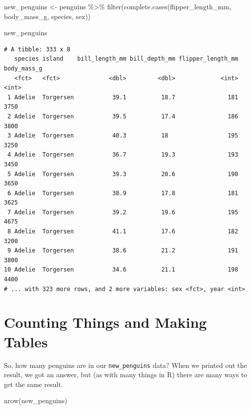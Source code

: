 \documentclass[
]{book}
\newenvironment{Shaded}{\begin{snugshade}}{\end{snugshade}}
\newcommand{\FunctionTok}[1]{\textcolor[rgb]{0.00,0.00,0.00}{#1}}
\newcommand{\NormalTok}[1]{#1}
\newcommand{\OtherTok}[1]{\textcolor[rgb]{0.56,0.35,0.01}{#1}}
\newcommand{\SpecialCharTok}[1]{\textcolor[rgb]{0.00,0.00,0.00}{#1}}
\begin{document}
\begin{Shaded}
\begin{Highlighting}[]
\NormalTok{new\_penguins }\OtherTok{\textless{}{-}}\NormalTok{ penguins }\SpecialCharTok{\%\textgreater{}\%}
    \FunctionTok{filter}\NormalTok{(}\FunctionTok{complete.cases}\NormalTok{(flipper\_length\_mm, body\_mass\_g, species, sex))}

\NormalTok{new\_penguins}
\end{Highlighting}
\end{Shaded}

\begin{verbatim}
# A tibble: 333 x 8
   species island    bill_length_mm bill_depth_mm flipper_length_mm body_mass_g
   <fct>   <fct>              <dbl>         <dbl>             <int>       <int>
 1 Adelie  Torgersen           39.1          18.7               181        3750
 2 Adelie  Torgersen           39.5          17.4               186        3800
 3 Adelie  Torgersen           40.3          18                 195        3250
 4 Adelie  Torgersen           36.7          19.3               193        3450
 5 Adelie  Torgersen           39.3          20.6               190        3650
 6 Adelie  Torgersen           38.9          17.8               181        3625
 7 Adelie  Torgersen           39.2          19.6               195        4675
 8 Adelie  Torgersen           41.1          17.6               182        3200
 9 Adelie  Torgersen           38.6          21.2               191        3800
10 Adelie  Torgersen           34.6          21.1               198        4400
# ... with 323 more rows, and 2 more variables: sex <fct>, year <int>
\end{verbatim}

\hypertarget{counting-things-and-making-tables}{%
\section{Counting Things and Making Tables}\label{counting-things-and-making-tables}}

So, how many penguins are in our \texttt{new\_penguins} data? When we printed out the result, we got an answer, but (as with many things in R) there are many ways to get the same result.

\begin{Shaded}
\begin{Highlighting}[]
\FunctionTok{nrow}\NormalTok{(new\_penguins)}
\end{Highlighting}
\end{Shaded}
\end{document}
